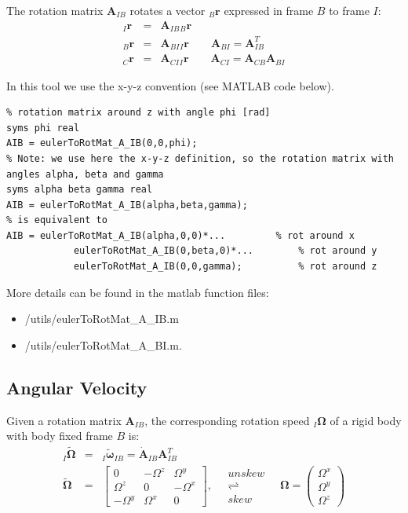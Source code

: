 The rotation matrix $\mathbf{A}_{IB}$ rotates a vector $_B\mathbf{r}$ expressed in frame $B$ to frame $I$:
\begin{eqnarray}
_I\mathbf{r} &=& \mathbf{A}_{IB} {}_B\mathbf{r}\\
_B\mathbf{r} &=& \mathbf{A}_{BI} {}_I\mathbf{r} \qquad \mathbf{A}_{BI} = \mathbf{A}_{IB}^T\\
_C\mathbf{r} &=& \mathbf{A}_{CI} {}_I\mathbf{r} \qquad \mathbf{A}_{CI} = \mathbf{A}_{CB}\mathbf{A}_{BI}
\end{eqnarray}

In this tool we use the x-y-z convention (see MATLAB code below).

\begin{lstlisting}
% rotation matrix around z with angle phi [rad]
syms phi real
AIB = eulerToRotMat_A_IB(0,0,phi);
% Note: we use here the x-y-z definition, so the rotation matrix with angles alpha, beta and gamma 
syms alpha beta gamma real
AIB = eulerToRotMat_A_IB(alpha,beta,gamma);
% is equivalent to
AIB = eulerToRotMat_A_IB(alpha,0,0)*...  		% rot around x 
			eulerToRotMat_A_IB(0,beta,0)*... 		% rot around y
			eulerToRotMat_A_IB(0,0,gamma); 			% rot around z
\end{lstlisting}

More details can be found in the matlab function files:
\begin{itemize}
\item /utils/eulerToRotMat\_A\_IB.m 
\item /utils/eulerToRotMat\_A\_BI.m.
\end{itemize}


\subsection{Angular Velocity}
Given a rotation matrix $\mathbf{A}_{IB}$, the corresponding rotation speed $_I\boldsymbol{\Omega}$ of a rigid body with body fixed frame $B$ is:
\begin{eqnarray}
_I\tilde{\boldsymbol{\Omega}} &=& {}_I\tilde{\boldsymbol{\omega}}_{IB} = \dot{\mathbf{A}}_{IB}\mathbf{A}_{IB}^T \\
\tilde{\boldsymbol{\Omega}} &=& \left[\begin{array}{ccc} 0&-\Omega^z & \Omega^y \\ \Omega^z & 0 & -\Omega^x \\ -\Omega^y & \Omega^x & 0\end{array}\right],\quad \begin{array}{c} unskew \\ \rightleftharpoons \\ skew \end{array} \quad \boldsymbol{\Omega} = \left(\begin{array}{c} \Omega^x\\ \Omega^y\\ \Omega^z \end{array} \right)
\end{eqnarray} 


